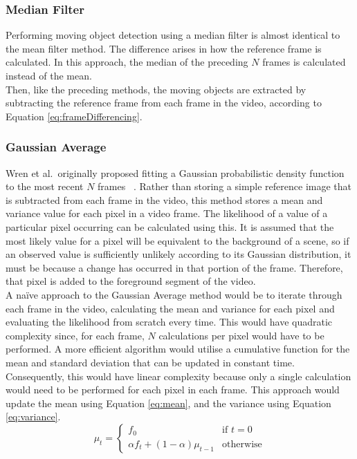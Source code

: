 \setlength{\leftskip}{0cm}
\subsubsection{Median Filter}
\setlength{\leftskip}{0.5cm}
\indent \indent
Performing moving object detection using a median filter is almost identical to the mean filter method. The difference arises in how the reference frame is calculated. In this approach, the median of the preceding $N$ frames is calculated instead of the mean.
\smallskip \\ \indent
Then, like the preceding methods, the moving objects are extracted by subtracting the reference frame from each frame in the video, according to Equation \ref{eq:frameDifferencing}.

\setlength{\leftskip}{0cm}
\subsubsection{Gaussian Average}
\setlength{\leftskip}{0.5cm}
\indent \indent
Wren et al.\ originally proposed fitting a Gaussian probabilistic density function to the most recent $N$ frames ~\cite{Wren}. Rather than storing a simple reference image that is subtracted from each frame in the video, this method stores a mean and variance value for each pixel in a video frame. The likelihood of a value of a particular pixel occurring can be calculated using this. It is assumed that the most likely value for a pixel will be equivalent to the background of a scene, so if an observed value is sufficiently unlikely according to its Gaussian distribution, it must be because a change has occurred in that portion of the frame. Therefore, that pixel is added to the foreground segment of the video.
\smallskip \\ \indent
A na\"ive approach to the Gaussian Average method would be to iterate through each frame in the video, calculating the mean and variance for each pixel and evaluating the likelihood from scratch every time. This would have quadratic complexity since, for each frame, $N$ calculations per pixel would have to be performed. A more efficient algorithm would utilise a cumulative function for the mean and standard deviation that can be updated in constant time. Consequently, this would have linear complexity because only a single calculation would need to be performed for each pixel in each frame. This approach would update the mean using Equation \ref{eq:mean}, and the variance using Equation \ref{eq:variance}.
\begin{equation}
    \label{eq:mean}
    \mu_t =
    \begin{cases}
        f_0 & \text{if $t = 0$} \\
        \alpha f_t + (1 - \alpha) \mu_{t-1} & \text{otherwise}
    \end{cases}
\end{equation}
